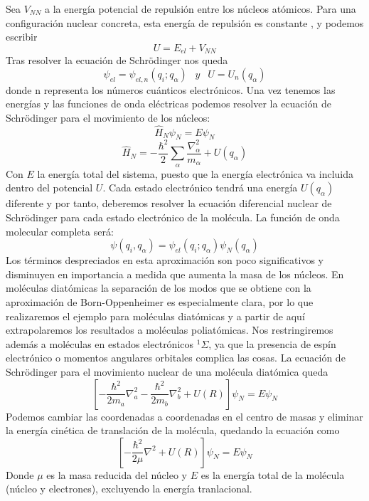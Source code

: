 \documentclass[a4paper]{article}
\begin{document}
Sea $V_{NN}$ a la energía potencial de repulsión entre los núcleos atómicos. Para una configuración nuclear concreta, esta energía de repulsión es constante , y podemos escribir 
\begin{equation}
U=E_{el}+V_{NN}
\end{equation}
Tras resolver la ecuación de Schrödinger nos queda 
\begin{equation}
\psi_{el}=\psi_{el,n}(q_i;q_\alpha)\,\ \,\ y \,\ \,\ U=U_n(q_\alpha)
\end{equation}
donde n representa los números cuánticos electrónicos.
Una vez tenemos las energías y las funciones de onda eléctricas podemos resolver la ecuación de Schrödinger para el movimiento de los núcleos:
\begin{equation}
\hat H_N\psi_N=E\psi_N
\end{equation}
\begin{equation}
\hat H_N=-\frac{\hbar^2}{2}\sum_\alpha \frac{\nabla^2_\alpha}{m_\alpha}+U(q_\alpha)
\end{equation}
Con $E$ la energía total del sistema, puesto que la energía electrónica va incluida dentro del potencial $U$. Cada estado electrónico tendrá una energía $U(q_\alpha)$ diferente y por tanto, deberemos resolver la ecuación diferencial nuclear de Schrödinger para cada estado electrónico de la molécula.
La función de onda molecular completa será:
\begin{equation}
\psi(q_i,q_\alpha )=\psi_{el}(q_i;q_\alpha )\psi_N(q_\alpha )
\end{equation}
Los términos despreciados en esta aproximación son poco significativos y disminuyen en importancia a medida que aumenta la masa de los núcleos.
En moléculas diatómicas la separación de los modos que se obtiene con la aproximación de Born-Oppenheimer es especialmente clara, por lo que realizaremos el ejemplo para moléculas diatómicas y a partir de aquí extrapolaremos los resultados a moléculas poliatómicas. Nos restringiremos además a moléculas en estados electrónicos $^1\Sigma$, ya que la presencia de espín electrónico o momentos angulares orbitales complica las cosas.
La ecuación de Schrödinger para el movimiento nuclear de una molécula diatómica queda
\begin{equation}
\left[-\frac{\hbar^2}{2m_a}\nabla^2_a-\frac{\hbar^2}{2m_b}\nabla^2_b+U(R)\right]\psi_N=E\psi_N
\end{equation}
Podemos cambiar las coordenadas a coordenadas en el centro de masas y eliminar la energía cinética de translación de la molécula, quedando la ecuación como
\begin{equation}
\left[-\frac{\hbar^2}{2\mu}\nabla^2+U(R)\right]\psi_N=E\psi_N
\end{equation}
Donde $\mu$ es la masa reducida del núcleo y $E$ es la energía total de la molécula (núcleo y electrones), excluyendo la energía tranlacional.\\
\end{document}
